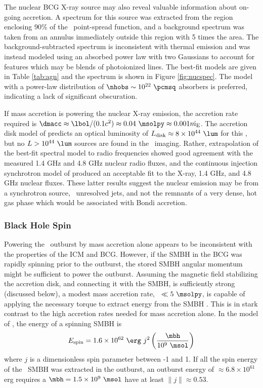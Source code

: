 \documentclass[11pt, preprint]{aastex}
\begin{document}
The nuclear BCG X-ray source may also reveal valuable information
about on-going accretion. A spectrum for this source was extracted
from the region enclosing 90\% of the \cxo\ point-spread function, and
a background spectrum was taken from an annulus immediately outside
this region with 5 times the area. The background-subtracted spectrum
is inconsistent with thermal emission and was instead modeled using an
absorbed power law with two Gaussians to account for features which
may be blends of photoionized lines. The best-fit models are given in
Table \ref{tab:agn} and the spectrum is shown in Figure
\ref{fig:nucspec}. The model with a power-law distribution of $\nhobs
\sim 10^{22} ~\pcmsq$ absorbers is preferred, indicating a lack of
significant obscuration.

If mass accretion is powering the nuclear X-ray emission, the
accretion rate required is $\dmacc \approx \lbol/(0.1 c^2) \approx
0.04 ~\msolpy \approx 0.001 \dme$. The accretion disk model of
\citet{2002NewAR..46..247M} predicts an optical luminosity of $\ldisk
\approx 8 \times 10^{44} ~\lum$ for this \dmacc, but no $L > 10^{44}
~\lum$ sources are found in the \hst\ imaging. Rather, extrapolation
of the best-fit spectral model to radio frequencies showed good
agreement with the measured 1.4 GHz and 4.8 GHz nuclear radio fluxes,
and the continuous injection synchrotron model of
\citet{1987MNRAS.225..335H} produced an acceptable fit to the X-ray,
1.4 GHz, and 4.8 GHz nuclear fluxes. These latter results suggest the
nuclear emission may be from a synchrotron source, \eg\ unresolved
jets, and not the remnants of a very dense, hot gas phase which would
be associated with Bondi accretion.

\subsubsection{Black Hole Spin}

Powering the \rbs\ outburst by mass accretion alone appears to be
inconsistent with the properties of the ICM and BCG. However, if the
SMBH in the BCG was rapidly spinning prior to the outburst, the stored
SMBH angular momentum might be sufficient to power the
outburst. Assuming the magnetic field stabilizing the accretion disk,
and connecting it with the SMBH, is sufficiently strong (discussed
below), a modest mass accretion rate, \eg\ $\ll 5 ~\msolpy$, is
capable of applying the necessary torque to extract energy from the
SMBH \citep{1999ApJ...522..753M}. This is in stark contrast to the
high accretion rates needed for mass accretion alone. In the model of
\citet{1999ApJ...522..753M}, the energy of a spinning SMBH is
\begin{equation}
  E_{\rm{spin}} = 1.6 \times 10^{62} ~{\erg} ~j^2
  \left(\frac{\mbh}{10^9 ~\msol}\right)
\end{equation}
where $j$ is a dimensionless spin parameter between -1 and 1. If all
the spin energy of the \rbs\ SMBH was extracted in the outburst, an
outburst energy of $\approx 6.8 \times 10^{61}$ erg requires a $\mbh =
1.5 \times 10^{9} ~\msol$ have at least $\|j\| \approx 0.53$.
\end{document}
